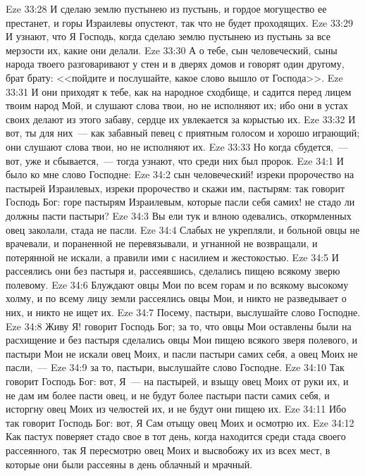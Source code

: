 \vs Eze 33:28 И сделаю землю пустынею из пустынь, и гордое могущество ее престанет, и горы Израилевы опустеют, так что не будет проходящих.
\vs Eze 33:29 И узнают, что Я Господь, когда сделаю землю пустынею из пустынь за все мерзости их, какие они делали.
\vs Eze 33:30 А о тебе, сын человеческий, сыны народа твоего разговаривают у стен и в дверях домов и говорят один другому, брат брату: <<пойдите и послушайте, какое слово вышло от Господа>>.
\vs Eze 33:31 И они приходят к тебе, как на народное сходбище, и садится перед лицем твоим народ Мой, и слушают слова твои, но не исполняют их; ибо они в устах своих делают из этого забаву, сердце их увлекается за корыстью их.
\vs Eze 33:32 И вот, ты для них~--- как забавный певец с приятным голосом и хорошо играющий; они слушают слова твои, но не исполняют их.
\vs Eze 33:33 Но когда сбудется,~--- вот, уже и сбывается,~--- тогда узнают, что среди них был пророк.
\vs Eze 34:1 И было ко мне слово Господне:
\vs Eze 34:2 сын человеческий! изреки пророчество на пастырей Израилевых, изреки пророчество и скажи им, пастырям: так говорит Господь Бог: горе пастырям Израилевым, которые пасли себя самих! не стадо ли должны пасти пастыри?
\vs Eze 34:3 Вы ели тук и влною одевались, откормленных овец заколали,  стада не пасли.
\vs Eze 34:4 Слабых не укрепляли, и больной овцы не врачевали, и пораненной не перевязывали, и угнанной не возвращали, и потерянной не искали, а правили ими с насилием и жестокостью.
\vs Eze 34:5 И рассеялись они без пастыря и, рассеявшись, сделались пищею всякому зверю полевому.
\vs Eze 34:6 Блуждают овцы Мои по всем горам и по всякому высокому холму, и по всему лицу земли рассеялись овцы Мои, и никто не разведывает о них, и никто не ищет их.
\vs Eze 34:7 Посему, пастыри, выслушайте слово Господне.
\vs Eze 34:8 Живу Я! говорит Господь Бог; за то, что овцы Мои оставлены были на расхищение и без пастыря сделались овцы Мои пищею всякого зверя полевого, и пастыри Мои не искали овец Моих, и пасли пастыри самих себя, а овец Моих не пасли,~---
\vs Eze 34:9 за то, пастыри, выслушайте слово Господне.
\vs Eze 34:10 Так говорит Господь Бог: вот, Я~--- на пастырей, и взыщу овец Моих от руки их, и не дам им более пасти овец, и не будут более пастыри пасти самих себя, и исторгну овец Моих из челюстей их, и не будут они пищею их.
\vs Eze 34:11 Ибо так говорит Господь Бог: вот, Я Сам отыщу овец Моих и осмотрю их.
\vs Eze 34:12 Как пастух поверяет стадо свое в тот день, когда находится среди стада своего рассеянного, так Я пересмотрю овец Моих и высвобожу их из всех мест, в которые они были рассеяны в день облачный и мрачный.
